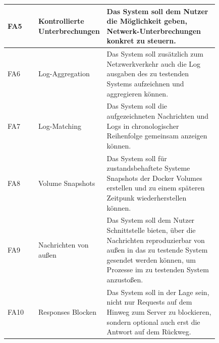 \documentclass[12pt,a4paper]{report}
\begin{document}
\begin{longtable}[H]{|p{}|p{0.3\linewidth}|p{0.53\linewidth}|}
	FA5  & Kontrollierte Unterbrechungen & Das System soll dem Nutzer die Möglichkeit geben, Netwerk-Unterbrechungen konkret zu steuern.                                                                                                                         \\ \hline
	FA6  & Log-Aggregation               & Das System soll zusätzlich zum Netzwerkverkehr auch die Log ausgaben des zu testenden Systems aufzeichnen und aggregieren können.                                                                                     \\ \hline
	FA7  & Log-Matching                  & Das System soll die aufgezeichneten Nachrichten und Logs in chronologischer Reihenfolge gemeinsam anzeigen können.                                                                                                    \\ \hline
	FA8  & Volume Snapshots              & Das System soll für zustandsbehaftete Systeme Snapshots der Docker Volumes erstellen und zu einem späteren Zeitpunk wiederherstellen können.                                                                          \\ \hline
	FA9  & Nachrichten von außen         & Das System soll dem Nutzer Schnittstelle bieten, über die Nachrichten reproduzierbar von außen in das zu testende System gesendet werden können, um Prozesse im zu testenden System anzustoßen.                       \\ \hline
	FA10 & Responses Blocken             & Das System soll in der Lage sein, nicht nur Requests auf dem Hinweg zum Server zu blockieren, sondern optional auch erst die Antwort auf dem Rückweg.                                                                 \\ \hline
\end{longtable}
\end{document}
